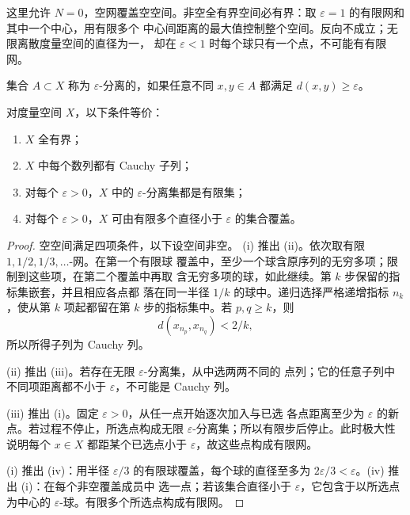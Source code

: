 这里允许 \(N=0\)，空网覆盖空空间。非空全有界空间必有界：取
\(\varepsilon=1\) 的有限网和其中一个中心，用有限多个
中心间距离的最大值控制整个空间。反向不成立；无限离散度量空间的直径为一，
却在 \(\varepsilon<1\) 时每个球只有一个点，不可能有有限网。

\begin{definition}
集合 \(A\subset X\) 称为 \(\varepsilon\)-分离的，如果任意不同
\(x,y\in A\) 都满足 \(d(x,y)\ge\varepsilon\)。
\end{definition}

\begin{theorem}[全有界性的序列判据]
\label{thm:total-bounded-characterizations}
对度量空间 \(X\)，以下条件等价：
\begin{enumerate}[label=\textup{(\roman*)}]
 \item \(X\) 全有界；
 \item \(X\) 中每个数列都有 Cauchy 子列；
 \item 对每个 \(\varepsilon>0\)，\(X\) 中的
 \(\varepsilon\)-分离集都是有限集；
 \item 对每个 \(\varepsilon>0\)，\(X\) 可由有限多个直径小于
 \(\varepsilon\) 的集合覆盖。
\end{enumerate}
\end{theorem}

\begin{proof}
空空间满足四项条件，以下设空间非空。
(i) 推出 (ii)。依次取有限 \(1,1/2,1/3,\ldots\)-网。在第一个有限球
覆盖中，至少一个球含原序列的无穷多项；限制到这些项，在第二个覆盖中再取
含无穷多项的球，如此继续。第 \(k\) 步保留的指标集嵌套，并且相应各点都
落在同一半径 \(1/k\) 的球中。递归选择严格递增指标 \(n_k\)，使从第
\(k\) 项起都留在第 \(k\) 步的指标集中。若 \(p,q\ge k\)，则
\[
 d(x_{n_p},x_{n_q})<2/k,
\]
所以所得子列为 Cauchy 列。

(ii) 推出 (iii)。若存在无限 \(\varepsilon\)-分离集，从中选两两不同的
点列；它的任意子列中不同项距离都不小于 \(\varepsilon\)，不可能是
Cauchy 列。

(iii) 推出 (i)。固定 \(\varepsilon>0\)，从任一点开始逐次加入与已选
各点距离至少为 \(\varepsilon\) 的新点。若过程不停止，所选点构成无限
\(\varepsilon\)-分离集；所以有限步后停止。此时极大性说明每个 \(x\in X\)
都距某个已选点小于 \(\varepsilon\)，故这些点构成有限网。

(i) 推出 (iv)：用半径 \(\varepsilon/3\) 的有限球覆盖，每个球的直径至多为
\(2\varepsilon/3<\varepsilon\)。(iv) 推出 (i)：在每个非空覆盖成员中
选一点；若该集合直径小于 \(\varepsilon\)，它包含于以所选点为中心的
\(\varepsilon\)-球。有限多个所选点构成有限网。
\end{proof}

